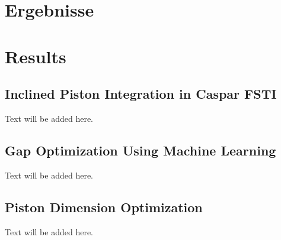   {\chapter{Ergebnisse}}
  {\chapter{Results}}
\label{sec:methods}

\section{Inclined Piston Integration in Caspar FSTI}
Text will be added here.

\section{Gap Optimization Using Machine Learning}
Text will be added here.

\section{Piston Dimension Optimization}
Text will be added here.
